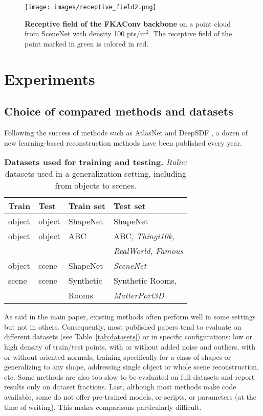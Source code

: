 \documentclass[10pt,twocolumn,letterpaper]{article}
\begin{document}
\begin{figure}[ht]
    \centering
    \vspace{-2mm}
    \texttt{[image: images/receptive\_field2.png]}
    \vspace{-1mm}
    \caption{\textbf{Receptive field of the FKAConv backbone} on a point cloud from SceneNet with density 100 pts/m$^2$. The receptive field of the point marked in green is colored in red.}
    \label{fig:receptive}
    \vspace*{-2mm}
\end{figure}


\section{Experiments}

\subsection{Choice of compared methods and datasets}

Following the success of methods such as AtlasNet \cite{Groueix2018CVPR} and DeepSDF \cite{Park2019CVPR}, a dozen of new learning-based reconstruction methods have been published every year.

\begin{table}[t]
\centering
\setlength{\tabcolsep}{3pt}
\noindent\begin{tabular}{l@{~}l|l|l}
Train & Test & Train set & Test set \\
\midrule
object & object & ShapeNet & ShapeNet \\
\midrule
object & object & ABC & ABC, \emph{Thingi10k,} \\
& & & \quad \emph{RealWorld, Famous}\\
\midrule
object & scene & ShapeNet & \emph{SceneNet} \\
\midrule
scene & scene
& Synthetic & Synthetic Rooms, \\
& & \quad Rooms & \quad \emph{MatterPort3D} 
\end{tabular}
\vspace{-2mm}
\caption{\textbf{Datasets used for training and testing.} \emph{Italic:} datasets used in a generalization setting, including from objects to scenes.}
\label{tab:useddatasets}
\vspace{-4mm}
\end{table}

As said in the main paper, existing methods often perform well in some settings but not in others. Consequently, most published papers tend to evaluate on different datasets (see Table~\ref{tab:datasets}) or in specific configurations: low or high density of train/test points, with or without added noise and outliers, with or without oriented normals, training specifically for a class of shapes or generalizing to any shape, addressing single object or whole scene reconstruction, etc.  Some methods are also too slow to be evaluated on full datasets and report results only on dataset fractions.  Last, although most methods make code available, some do not offer pre-trained models, or scripts, or parameters (at the time of writing).
This makes comparisons particularly difficult. 
\end{document}
